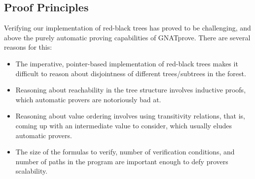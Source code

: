 \documentclass{llncs}
\newcommand{\gnatprove}{GNATprove\xspace}
\begin{document}



\subsection{Proof Principles}


Verifying our implementation of red-black trees has proved to be challenging,
and above the purely automatic proving capabilities of \gnatprove. There
are several reasons for this:

\begin{itemize}
 \item The imperative, pointer-based implementation of red-black trees makes it difficult
 to reason about disjointness of different trees/subtrees in the forest.
 \item Reasoning about reachability in the tree structure involves inductive proofs, which
 automatic provers are notoriously bad at.
 \item Reasoning about value ordering involves using transitivity relations, that is, coming
 up with an intermediate value to consider, which usually eludes automatic provers.
 \item The size of the formulas to verify, number of verification conditions, and number of
 paths in the program are important enough to defy provers scalability.
\end{itemize}
\end{document}
